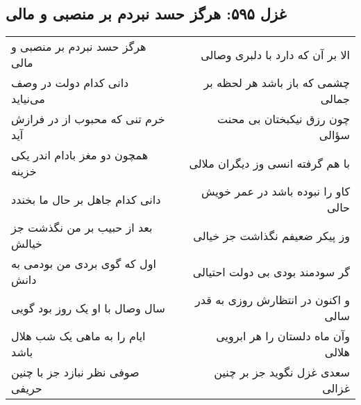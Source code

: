 \begin{center}
\section*{غزل ۵۹۵: هرگز حسد نبردم بر منصبی و مالی}
\label{sec:595}
\begin{longtable}{l p{0.5cm} r}
هرگز حسد نبردم بر منصبی و مالی
&&
الا بر آن که دارد با دلبری وصالی
\\
دانی کدام دولت در وصف می‌نیاید
&&
چشمی که باز باشد هر لحظه بر جمالی
\\
خرم تنی که محبوب از در فرازش آید
&&
چون رزق نیکبختان بی محنت سؤالی
\\
همچون دو مغز بادام اندر یکی خزینه
&&
با هم گرفته انسی وز دیگران ملالی
\\
دانی کدام جاهل بر حال ما بخندد
&&
کاو را نبوده باشد در عمر خویش حالی
\\
بعد از حبیب بر من نگذشت جز خیالش
&&
وز پیکر ضعیفم نگذاشت جز خیالی
\\
اول که گوی بردی من بودمی به دانش
&&
گر سودمند بودی بی دولت احتیالی
\\
سال وصال با او یک روز بود گویی
&&
و اکنون در انتظارش روزی به قدر سالی
\\
ایام را به ماهی یک شب هلال باشد
&&
وآن ماه دلستان را هر ابرویی هلالی
\\
صوفی نظر نبازد جز با چنین حریفی
&&
سعدی غزل نگوید جز بر چنین غزالی
\\
\end{longtable}
\end{center}

